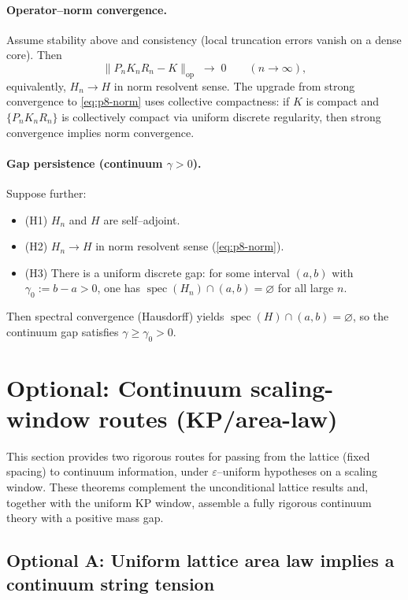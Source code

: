 \documentclass[11pt]{amsart}
\theoremstyle{plain}
\theoremstyle{definition}
\theoremstyle{remark}
\begin{document}
\paragraph{Operator--norm convergence.}
Assume stability above and consistency (local truncation errors vanish on a dense core). Then
\begin{equation}
\label{eq:p8-norm}
  \big\lVert P_n K_n R_n - K\big\rVert_{\mathrm{op}}\;\longrightarrow\;0\qquad (n\to\infty),
\end{equation}
equivalently, $H_n\to H$ in norm resolvent sense. The upgrade from strong convergence to \eqref{eq:p8-norm} uses collective compactness: if $K$ is compact and $\{P_n K_n R_n\}$ is collectively compact via uniform discrete regularity, then strong convergence implies norm convergence.

\paragraph{Gap persistence (continuum $\gamma>0$).}
Suppose further:
\begin{itemize}
  \item (H1) $H_n$ and $H$ are self--adjoint.
  \item (H2) $H_n\to H$ in norm resolvent sense (\eqref{eq:p8-norm}).
  \item (H3) There is a uniform discrete gap: for some interval $(a,b)$ with $\gamma_0:=b-a>0$, one has $\operatorname{spec}(H_n)\cap(a,b)=\varnothing$ for all large $n$.
\end{itemize}
Then spectral convergence (Hausdorff) yields $\operatorname{spec}(H)\cap(a,b)=\varnothing$, so the continuum gap satisfies $\gamma\ge \gamma_0>0$.
\section{Optional: Continuum scaling-window routes (KP/area-law)}

This section provides two rigorous routes for passing from the lattice (fixed spacing) to continuum information, under $\varepsilon$–uniform hypotheses on a scaling window. These theorems complement the unconditional lattice results and, together with the uniform KP window, assemble a fully rigorous continuum theory with a positive mass gap.

\subsection*{Optional A: Uniform lattice area law implies a continuum string tension}
\end{document}
